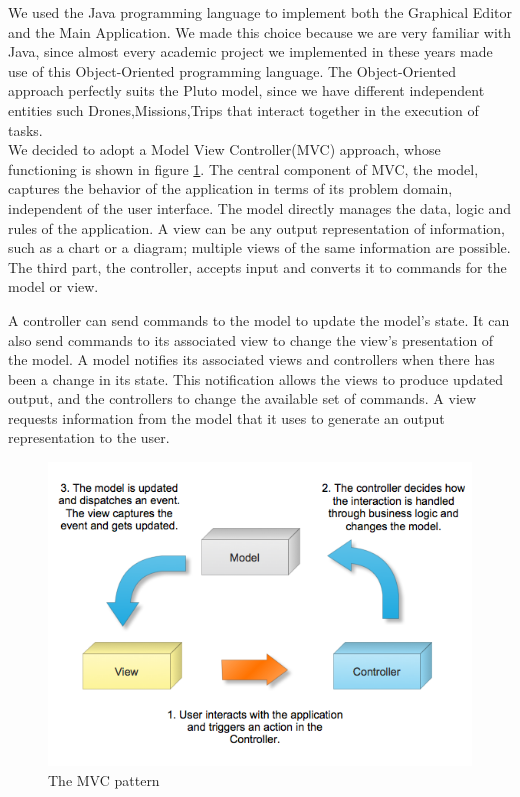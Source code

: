 We used the Java programming language to implement both the Graphical Editor and the Main Application.
We made this choice because we are very familiar with Java, since almost every academic project we implemented in these years made use of this Object-Oriented programming language.
The Object-Oriented approach perfectly suits the Pluto model, since we have different independent entities such Drones,Missions,Trips that interact together in the execution of tasks.
\\

We decided to adopt a Model View Controller(MVC) approach, whose functioning is shown in figure \ref{fig:mvc}.
The central component of MVC, the model, captures the behavior of the application in terms of its problem domain, independent of the user interface.
The model directly manages the data, logic and rules of the application.
A view can be any output representation of information, such as a chart or a diagram; multiple views of the same information are possible.
The third part, the controller, accepts input and converts it to commands for the model or view.

A controller can send commands to the model to update the model's state.
It can also send commands to its associated view to change the view's presentation of the model.
A model notifies its associated views and controllers when there has been a change in its state. This notification allows the views to produce updated output, and the controllers to change the available set of commands.
A view requests information from the model that it uses to generate an output representation to the user.

\begin{figure}[H]
\centering
\includegraphics[width=\linewidth]
{pictures/MVC.png}
  \caption{The MVC pattern}
  \label{fig:mvc}
\end{figure}

